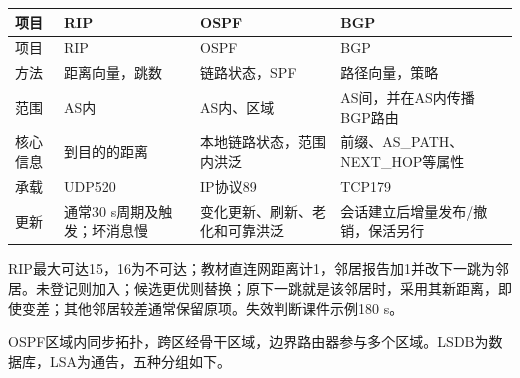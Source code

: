 \par\smallskip
\begin{wideblock}
{\fontsize{9.3}{12}\selectfont\setlength{\tabcolsep}{2.5pt}\setlength{\LTleft}{0pt}\setlength{\LTright}{0pt}
\begin{longtable}{@{}>{\raggedright\arraybackslash}p{}>{\raggedright\arraybackslash}p{}>{\raggedright\arraybackslash}p{}>{\raggedright\arraybackslash}p{}@{}}
\toprule
项目 & RIP & OSPF & BGP \\

\midrule\endfirsthead\toprule
项目 & RIP & OSPF & BGP \\

\midrule\endhead\bottomrule\endfoot
方法 & 距离向量，跳数 & 链路状态，SPF & 路径向量，策略 \\

范围 & AS内 & AS内、区域 & AS间，并在AS内传播BGP路由 \\

核心信息 & 到目的的距离 & 本地链路状态，范围内洪泛 & 前缀、AS\_PATH、NEXT\_HOP等属性 \\

承载 & UDP520 & IP协议89 & TCP179 \\

更新 & 通常30 s周期及触发；坏消息慢 & 变化更新、刷新、老化和可靠洪泛 & 会话建立后增量发布/撤销，保活另行 \\

\end{longtable}}
\end{wideblock}
\par\smallskip

RIP最大可达15，16为不可达；教材直连网距离计1，邻居报告加1并改下一跳为邻居。未登记则加入；候选更优则替换；原下一跳就是该邻居时，采用其新距离，即使变差；其他邻居较差通常保留原项。失效判断课件示例180 s。

OSPF区域内同步拓扑，跨区经骨干区域，边界路由器参与多个区域。LSDB为数据库，LSA为通告，五种分组如下。

